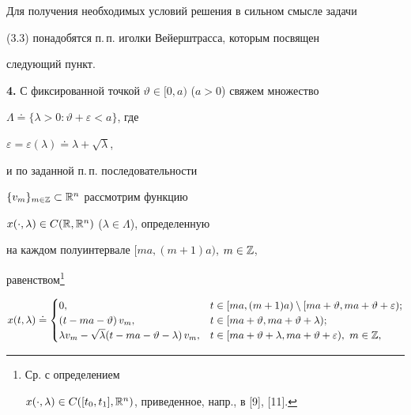 Для получения необходимых условий решения в сильном смысле задачи


(3.3) понадобятся п.\,п. иголки Вейерштрасса, которым посвящен


следующий пункт.


\medskip





\addtocounter{section}{1}


\setcounter{equation}{0}


\setcounter{thms}{0}


\setcounter{lems}{0}


\setcounter{defns}{0}


\setcounter{footnote}{0}





{\bf 4.} С фиксированной точкой $\vartheta\in [0,a)$ ($a>0$) свяжем множество


$\Lambda\doteq\{\lambda>0:\vartheta+\varepsilon<a\}$, где


$\varepsilon=\varepsilon(\lambda)\doteq\lambda+\sqrt{\lambda}$,


и по заданной п.\,п. последовательности


$\{v_m\}_{m\in\Bbb Z}\subset\Bbb R^n$ рассмотрим функцию


$x(\cdot,\lambda)\in C(\Bbb R,\Bbb R^n)$ ($\lambda\in\Lambda$), определенную


на каждом полуинтервале $[ma,(m+1)a)$, $m\in{\Bbb Z}$,


равенством\footnote{Ср. с определением


$x(\cdot,\lambda)\in C([t_0,t_1],\Bbb R^n)$, приведенное, напр., в [9], [11].}


\begin{equation}


x(t,\lambda)\doteq \begin{cases} 0, & t\in [ma,(m+1)a)\setminus


[ma+\vartheta,ma+\vartheta+\varepsilon);\\


(t-ma-\vartheta)\,v_m, &


t\in[ma+\vartheta,ma+\vartheta+\lambda);\\


\lambda v_m-\sqrt{\lambda}(t-ma-\vartheta-\lambda)\,v_m, & t\in


[ma+\vartheta+\lambda,ma+\vartheta+\varepsilon), \ m\in{\Bbb Z},


\end{cases}


\end{equation}


